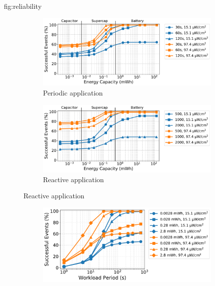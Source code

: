 \begin{definefigure*}{fig:reliability}
  \centering
  \begin{subfigure}{\textwidth}
    \begin{subfigure}{0.5\textwidth}
      \centering
      \includegraphics[width=0.9\linewidth]{figs/capacity/sense_and_send/events_vs_secondary_size}
        \caption{Periodic application}
      \label{fig:reliability:sensesec}
    \end{subfigure}
    \begin{subfigure}{0.5\textwidth}
      \centering
      \includegraphics[width=0.9\linewidth]{figs/capacity/door_occupancy/events_vs_secondary_size}
      \caption{Reactive application}
      \label{fig:reliability:eventsec}
    \end{subfigure}
  \end{subfigure}
  \begin{subfigure}{\textwidth}
    \begin{subfigure}{0.5\textwidth}
      \centering
      \includegraphics[width=0.9\linewidth]{figs/capacity/sense_and_send/events_vs_period}

\end{subfigure}
\end{subfigure}
\end{definefigure*}
